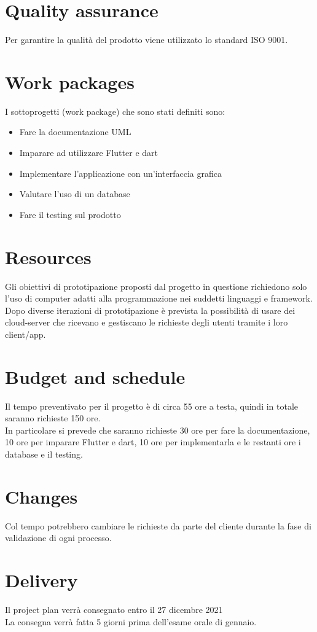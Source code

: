 \documentclass{article}
\begin{document}
\section{Quality assurance}
Per garantire la qualità del prodotto viene utilizzato lo standard ISO 9001.

\section{Work packages}
I sottoprogetti (work package) che sono stati definiti sono:
\begin{itemize}
    \item Fare la documentazione UML
    \item Imparare ad utilizzare Flutter e dart
    \item Implementare l'applicazione con un'interfaccia grafica
    \item Valutare l'uso di un database
    \item Fare il testing sul prodotto
\end{itemize}

\section{Resources}
Gli obiettivi di prototipazione proposti dal progetto in questione richiedono solo l'uso di computer adatti alla programmazione nei suddetti linguaggi e framework.
Dopo diverse iterazioni di prototipazione è prevista la possibilità di usare dei cloud-server che ricevano e gestiscano le richieste degli utenti tramite i loro client/app. 

\section{Budget and schedule}
Il tempo preventivato per il progetto è di circa 55 ore a testa, quindi in totale saranno richieste 150 ore.
\\In particolare si prevede che saranno richieste 30 ore per fare la documentazione, 10 ore per imparare Flutter e dart, 10 ore per implementarla
e le restanti ore i database e il testing.
\section{Changes}
Col tempo potrebbero cambiare le richieste da parte del cliente durante la fase di validazione di ogni processo.

\section{Delivery}
Il project plan verrà consegnato entro il 27 dicembre 2021
\\La consegna verrà fatta 5 giorni prima dell'esame orale di gennaio.
\end{document}
